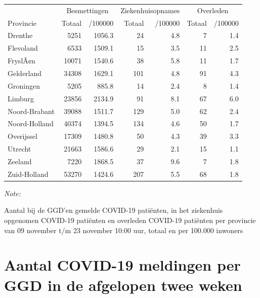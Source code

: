 \documentclass[
  english,
  man,floatsintext]{apa6}
\begin{document}
\begin{table}
\centering
\begin{threeparttable}
\begin{tabular}{lrrrrrr}
\toprule
\multicolumn{1}{c}{ } & \multicolumn{2}{c}{Besmettingen} & \multicolumn{2}{c}{Ziekenhuisopnames} & \multicolumn{2}{c}{Overleden} \\
\cmidrule(l{3pt}r{3pt}){2-3} \cmidrule(l{3pt}r{3pt}){4-5} \cmidrule(l{3pt}r{3pt}){6-7}
Provincie & Totaal & /100000 & Totaal & /100000 & Totaal & /100000\\
\midrule
Drenthe & 5251 & 1056.3 & 24 & 4.8 & 7 & 1.4\\
Flevoland & 6533 & 1509.1 & 15 & 3.5 & 11 & 2.5\\
FryslÃ¢n & 10071 & 1540.6 & 38 & 5.8 & 11 & 1.7\\
Gelderland & 34308 & 1629.1 & 101 & 4.8 & 91 & 4.3\\
Groningen & 5205 & 885.8 & 14 & 2.4 & 8 & 1.4\\
Limburg & 23856 & 2134.9 & 91 & 8.1 & 67 & 6.0\\
Noord-Brabant & 39088 & 1511.7 & 129 & 5.0 & 62 & 2.4\\
Noord-Holland & 40374 & 1394.5 & 134 & 4.6 & 50 & 1.7\\
Overijssel & 17309 & 1480.8 & 50 & 4.3 & 39 & 3.3\\
Utrecht & 21663 & 1586.6 & 29 & 2.1 & 15 & 1.1\\
Zeeland & 7220 & 1868.5 & 37 & 9.6 & 7 & 1.8\\
Zuid-Holland & 53270 & 1424.6 & 207 & 5.5 & 68 & 1.8\\
\bottomrule
\end{tabular}
\begin{tablenotes}
\item \textit{Note: } 
\item Aantal bij de GGD’en gemelde COVID-19 patiënten, in het ziekenhuis opgenomen COVID-19 patiënten en overleden COVID-19 patiënten per provincie van 09 november t/m 23 november 10:00 uur, totaal en per 100.000 inwoners
\end{tablenotes}
\end{threeparttable}
\end{table}

\newpage

\hypertarget{aantal-covid-19-meldingen-per-ggd-in-de-afgelopen-twee-weken}{%
\section{Aantal COVID-19 meldingen per GGD in de afgelopen twee weken}\label{aantal-covid-19-meldingen-per-ggd-in-de-afgelopen-twee-weken}}
\end{document}
